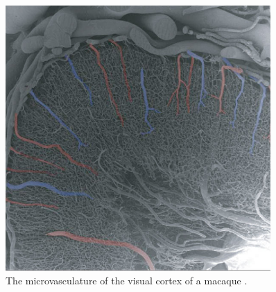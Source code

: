\begin{figure}[!ht]
	\centering
	\includegraphics[width=0.9\textwidth, clip=true]{./Chapters/01_Introduction/Images/Microvasculature}
	\caption{The microvasculature of the visual cortex of a macaque \cite{Weber2008}. }
	\label{fig:microvasulature}
\end{figure}